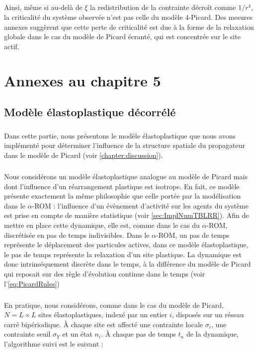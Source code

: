 \subparagraph{}Ainsi, même si au-delà de $\xi$ la redistribution de la contrainte décroît comme $1/r^4$, la criticalité du système observée n'est pas celle du modèle 4-Picard. Des mesures annexes suggèrent que cette perte de criticalité est due à la forme de la relaxation globale dans le cas du modèle de Picard écranté, qui est concentrée sur le site actif.

\section{Annexes au chapitre 5}

\subsection{Modèle élastoplastique décorrélé}

\label{sec:EPMdiscret}

\subparagraph{}Dans cette partie, nous présentons le modèle élastoplastique que nous avons implémenté pour déterminer l'influence de la structure spatiale du propagateur dans le modèle de Picard (voir \autoref{chapter:discussion}).

\subparagraph{}Nous considérons un modèle élastoplastique analogue au modèle de Picard mais dont l'influence d'un réarrangement plastique est isotrope. En fait, ce modèle présente exactement la même philosophie que celle portée par la modélisation dans le $\alpha$-ROM : l'influence d'un évènement d'activité sur les agents du système est prise en compte de manière statistique (voir \autoref{sec:ImplNumTBLRR}). Afin de mettre en place cette dynamique, elle est, comme dans le cas du $\alpha$-ROM, discrétisée en pas de temps indivisibles. Dans le $\alpha$-ROM, un pas de temps représente le déplacement des particules actives, dans ce modèle élastoplastique, le pas de temps représente la relaxation d'un site plastique. La dynamique est donc intrinséquement discrète dans le temps, à la différence du modèle de Picard qui reposait sur des règle d'évolution continue dans le temps (voir l'\autoref{eq:PicardRules})

\subparagraph{}En pratique, nous considérons, comme dans le cas du modèle de Picard, $N = L\times L$ sites élastoplastiques, indexé par un entier $i$, disposés sur un réseau carré bipériodique. \`A chaque site est affecté une contrainte locale $\sigma_i$, une contrainte seuil $\sigma_Y$ et un état $n_i$. \`A chaque pas de temps $t_n$ de la dynamique, l'algorithme suivi est le suivant :

